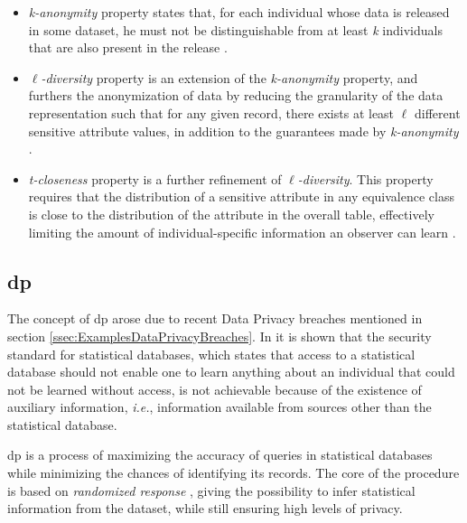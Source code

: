 \begin{itemize}
    \item \textit{k-anonymity} property states that, for each individual whose data is released in some dataset, he must not be distinguishable from at least \textit{k} individuals that are also present in the release \cite{sweeney2002k}. 

    \item $\ell$\textit{-diversity} property is an extension of the \textit{k-anonymity} property, and furthers the anonymization of data by reducing the granularity of the data representation such that for any given record, there exists at least $\ell$ different sensitive attribute values, in addition to the guarantees made by \textit{k-anonymity} \cite{machanavajjhala2007diversity}.

    \item \textit{t-closeness} property is a further refinement of $\ell$\textit{-diversity}. This property requires that the distribution of a sensitive attribute in any equivalence class is close to the distribution of the attribute in the overall table, effectively limiting the amount of individual-specific information an observer can learn \cite{li2007t}.  
\end{itemize} 


\subsection{\acl{dp}}
\label{ssec:DifferentialPrivacy}


The concept of \acf{dp} arose due to recent Data Privacy breaches mentioned in section \ref{ssec:ExamplesDataPrivacyBreaches}. In \cite{Dwork2006} it is shown that the security standard for statistical databases, which states that access to a statistical database should not enable one to learn anything about an individual that could not be learned without access, is not achievable because of the existence of auxiliary information, \textit{i.e.}, information available from sources other than the statistical database.

\ac{dp} is a process of maximizing the accuracy of queries in statistical databases while minimizing the chances of identifying its records. The core of the procedure is based on \textit{randomized response} \cite{warner1965randomized}, giving the possibility to infer statistical information from the dataset, while still ensuring high levels of privacy.

